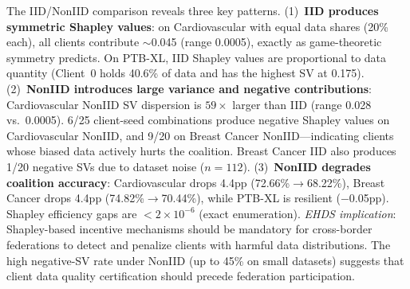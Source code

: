 \documentclass[conference]{IEEEtran}
\begin{document}
\begin{table}[htbp]
\centering
\caption{Shapley Values: Mean Client Contributions (5 seeds, $\pm$ std)}
\label{tab:shapley_values}

\vspace{1mm}
\footnotesize{The IID/NonIID comparison reveals three key patterns. (1)~\textbf{IID produces symmetric Shapley values}: on Cardiovascular with equal data shares (20\% each), all clients contribute $\sim$0.045 (range 0.0005), exactly as game-theoretic symmetry predicts. On PTB-XL, IID Shapley values are proportional to data quantity (Client~0 holds 40.6\% of data and has the highest SV at 0.175). (2)~\textbf{NonIID introduces large variance and negative contributions}: Cardiovascular NonIID SV dispersion is $59\times$ larger than IID (range 0.028 vs.\ 0.0005). 6/25 client-seed combinations produce negative Shapley values on Cardiovascular NonIID, and 9/20 on Breast Cancer NonIID---indicating clients whose biased data actively hurts the coalition. Breast Cancer IID also produces 1/20 negative SVs due to dataset noise ($n{=}112$). (3)~\textbf{NonIID degrades coalition accuracy}: Cardiovascular drops 4.4pp (72.66\%$\to$68.22\%), Breast Cancer drops 4.4pp (74.82\%$\to$70.44\%), while PTB-XL is resilient ($-$0.05pp). Shapley efficiency gaps are $<2 \times 10^{-6}$ (exact enumeration). \textit{EHDS implication}: Shapley-based incentive mechanisms should be mandatory for cross-border federations to detect and penalize clients with harmful data distributions. The high negative-SV rate under NonIID (up to 45\% on small datasets) suggests that client data quality certification should precede federation participation.}
\end{table}
\end{document}
